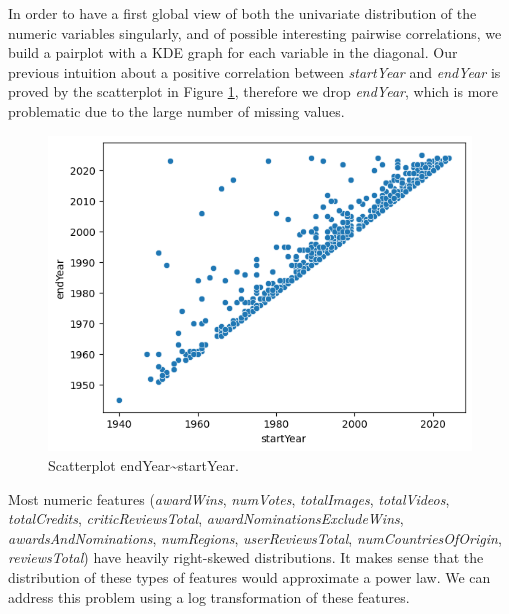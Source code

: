 In order to have a first global view of both the univariate distribution of the numeric variables singularly, and of possible interesting pairwise correlations, we build a pairplot with a KDE graph for each variable in the diagonal.
Our previous intuition about a positive correlation between \textit{startYear} and \textit{endYear} is proved by the scatterplot in Figure \ref{fig:scatterplot_endYear_startYear.png}, therefore we drop \textit{endYear}, which is more problematic due to the large number of missing values.

\begin{figure}
    \includegraphics[width=\columnwidth]{../results/images/scatterplot_endYear_startYear.png}
    \caption{Scatterplot endYear\textasciitilde startYear.}
    \label{fig:scatterplot_endYear_startYear.png}
\end{figure}

Most numeric features (\textit{awardWins}, \textit{numVotes}, \textit{totalImages}, \textit{totalVideos}, \textit{totalCredits}, \textit{criticReviewsTotal}, \textit{awardNominationsExcludeWins}, \textit{awardsAndNominations}, \textit{numRegions}, \textit{userReviewsTotal}, \textit{numCountriesOfOrigin}, \textit{reviewsTotal}) have heavily right-skewed distributions. It makes sense that the distribution of these types of features would approximate a power law. We can address this problem using a log transformation of these features.


